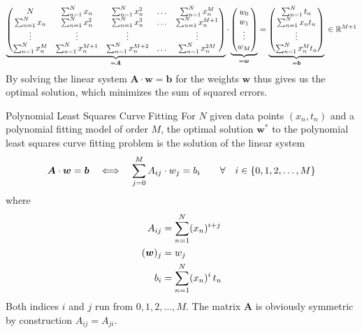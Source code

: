 \documentclass[11pt,DINA4, fleqn]{amsart}
\def\vw{\boldsymbol{w}\xspace}
\def\vb{\boldsymbol{b}\xspace}
\def\mA{\boldsymbol{A}\xspace}
\begin{document}
\begin{align}
\underbrace{
\begin{pmatrix}
N & \sum\displaylimits_{n = 1}^{N}x_n & \sum\displaylimits_{n = 1}^{N}x_n^2 & \dots & \sum\displaylimits_{n = 1}^{N}x_n^M \\
\sum\displaylimits_{n = 1}^{N}x_n & \sum\displaylimits_{n = 1}^{N}x_n^2 &
\sum\displaylimits_{n = 1}^{N}x_n^3 & \dots &
\sum\displaylimits_{n = 1}^{N}x_n^{M + 1} \\
\vdots & \vdots & \vdots && \vdots \\ 
\sum\displaylimits_{n = 1}^{N}x_n^M &
\sum\displaylimits_{n = 1}^{N}x_n^{M+1} &
\sum\displaylimits_{n = 1}^{N}x_n^{M+2} &
\dotsc &  \sum\displaylimits_{n = 1}^{N}x_n^{2M}
\end{pmatrix}}_{=\mA} \cdot
\underbrace{\begin{pmatrix}
w_0 \\ w_1 \\ \vdots \\ w_M
\end{pmatrix}}_{=\vw}
=
\underbrace{\begin{pmatrix}
\sum\displaylimits_{n = 1}^{N} t_n \\
\sum\displaylimits_{n = 1}^{N} x_n t_n \\
\vdots \\
\sum\displaylimits_{n = 1}^{N} x_n^M t_n 
\end{pmatrix}}_{=\vb} \, \in \mathbb{R}^{M+1}
\end{align}
By solving the linear system $\mA \cdot \vw = \vb$ for the weights $\vw$ thus gives us the optimal solution, which minimizes the sum of squared errors.

\begin{mybox_tc3}{Polynomial Least Squares Curve Fitting}
	For $N$ given data points $(x_n, t_n)$ and a polynomial fitting model of order $M$,
	the optimal solution $\vw^*$ to the polynomial least squares curve fitting problem is the solution of the linear system
	\begin{align}
	\mA \cdot \vw = \vb \quad \Longleftrightarrow \quad \sum \displaylimits_{j = 0}^{M} A_{ij} \cdot w_j = b_i  \qquad \forall\quad i \in \{0, 1, 2, \dotsc, M\}
	\end{align}
	where
	\begin{align}
	A_{ij} &= \sum \displaylimits_{n = 1}^{N} (x_n)^{i + j} \\
	(\vw)_j &= w_j \\
	b_i &= \sum \displaylimits_{n = 1}^{N} (x_n)^{i} \, t_n
	\end{align}
	Both indices $i$ and $j$ run from $0, 1, 2, \dotsc, M$.
	The matrix $\mA$ is obviously symmetric by construction $A_{ij} = A_{ji}$.
\end{mybox_tc3}
\end{document}
